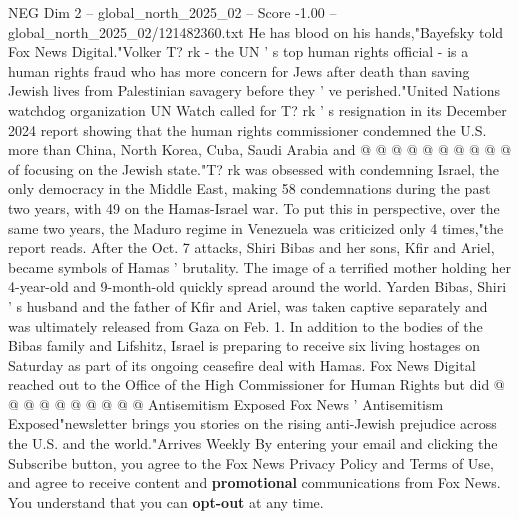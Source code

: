\begin{textsample}{NEG Dim 2 – global\_north\_2025\_02 – Score -1.00 – global\_north\_2025\_02/121482360.txt}
He has blood on his hands,"Bayefsky told Fox News Digital."Volker T? rk - the UN ' s top human rights official - is a human rights fraud who has more concern for Jews after death than saving Jewish lives from Palestinian savagery before they ' ve perished."United Nations watchdog organization UN Watch called for T? rk ' s resignation in its December 2024 report showing that the human rights commissioner condemned the U.S. more than China, North Korea, Cuba, Saudi Arabia and @ @ @ @ @ @ @ @ @ @ of focusing on the Jewish state."T? rk was obsessed with condemning Israel, the only democracy in the Middle East, making 58 condemnations during the past two years, with 49 on the Hamas-Israel war.
To put this in perspective, over the same two years, the Maduro regime in Venezuela was criticized only 4 times,"the report reads.
After the Oct. 7 attacks, Shiri Bibas and her sons, Kfir and Ariel, became symbols of Hamas ' brutality.
The image of a terrified mother holding her 4-year-old and 9-month-old quickly spread around the world.
Yarden Bibas, Shiri ' s husband and the father of Kfir and Ariel, was taken captive separately and was ultimately released from Gaza on Feb. 1.
In addition to the bodies of the Bibas family and Lifshitz, Israel is preparing to receive six living hostages on Saturday as part of its ongoing ceasefire deal with Hamas.
Fox News Digital reached out to the Office of the High Commissioner for Human Rights but did @ @ @ @ @ @ @ @ @ @ Antisemitism Exposed Fox News ' Antisemitism Exposed"newsletter brings you stories on the rising anti-Jewish prejudice across the U.S. and the world."Arrives Weekly By entering your email and clicking the Subscribe button, you agree to the Fox News Privacy Policy and Terms of Use, and agree to receive content and \textbf{promotional} communications from Fox News.
You understand that you can \textbf{opt-out} at any time.

\end{textsample}
